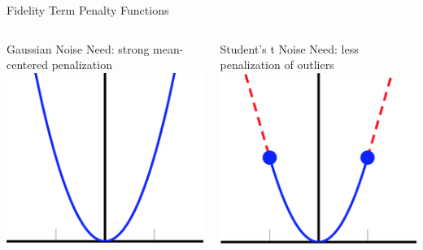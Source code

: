 \documentclass[12pt]{beamer}
\begin{document}
\begin{frame}{Fidelity Term Penalty Functions}
\vspace{-3ex}
\begin{columns}[T]
	\begin{column}{0.45\linewidth}
		\begin{block}{Gaussian Noise}
		Need: strong mean-centered penalization \\
		\includegraphics[scale=0.1]{../figures/quadratic}
		\end{block}
	\end{column}
	\begin{column}{0.45\linewidth}
		\begin{block}{Student's t Noise}
		Need: less penalization of outliers \\
		\includegraphics[scale=0.1]{../figures/huber}
		\end{block}
	\end{column}
\end{columns}

\end{frame}
\end{document}
